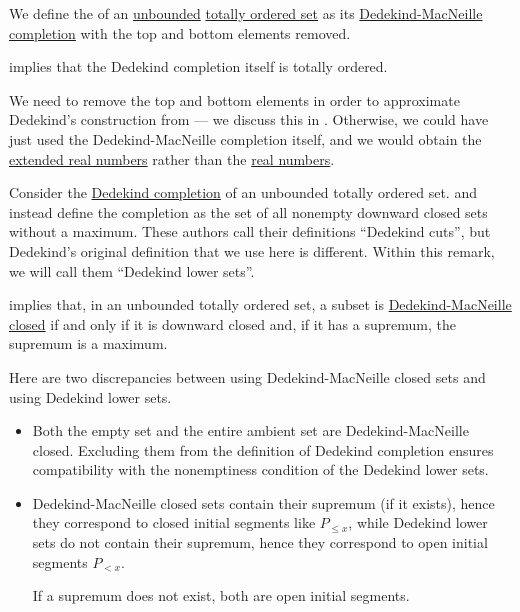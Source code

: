 \begin{definition}\label{def:dedekind_completion}\mimprovised
  We define the  of an \hyperref[def:extremal_points/bounds]{unbounded} \hyperref[def:totally_ordered_set]{totally ordered set} as its \hyperref[def:dedekind_macnielle_completion]{Dedekind-MacNeille completion} with the top and bottom elements removed.
\end{definition}
\begin{comments}
  \item {} implies that the Dedekind completion itself is totally ordered.
  \item We need to remove the top and bottom elements in order to approximate Dedekind's construction from \cite[sec. I.IV]{Beman1901DedekindEssays} --- we discuss this in . Otherwise, we could have just used the Dedekind-MacNeille completion itself, and we would obtain the \hyperref[def:extended_real_numbers]{extended real numbers} rather than the \hyperref[def:real_numbers]{real numbers}.
\end{comments}

\begin{remark}\label{rem:dedekind_completion_through_dedekind_macneille_closures}
  Consider the \hyperref[def:dedekind_completion]{Dedekind completion} of an unbounded totally ordered set.  and  instead define the completion as the set of all nonempty downward closed sets without a maximum. These authors call their definitions \enquote{Dedekind cuts}, but Dedekind's original definition that we use here is different. Within this remark, we will call them \enquote{Dedekind lower sets}.

   implies that, in an unbounded totally ordered set, a subset is \hyperref[def:dedekind_macnielle_closure]{Dedekind-MacNeille closed} if and only if it is downward closed and, if it has a supremum, the supremum is a maximum.

  Here are two discrepancies between using Dedekind-MacNeille closed sets and using Dedekind lower sets.
  \begin{itemize}
    \item Both the empty set and the entire ambient set are Dedekind-MacNeille closed. Excluding them from the definition of Dedekind completion ensures compatibility with the nonemptiness condition of the Dedekind lower sets.

    \item Dedekind-MacNeille closed sets contain their supremum (if it exists), hence they correspond to closed initial segments like \( P_{\leq x} \), while Dedekind lower sets do not contain their supremum, hence they correspond to open initial segments \( P_{< x} \).

    If a supremum does not exist, both are open initial segments.
  \end{itemize}
\end{remark}

